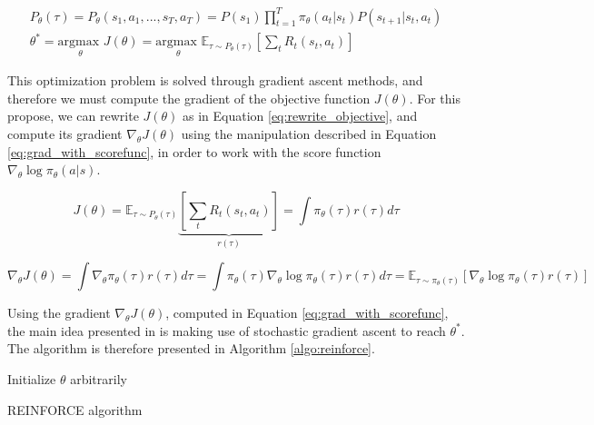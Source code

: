 \begin{align}
P_{\theta}(\tau) = P_{\theta}(s_1,a_1,...,s_T,a_T) = P(s_1)\prod_{t=1}^T{\pi_{\theta}(a_t|s_t) P(s_{t+1}|s_t,a_t)} 
\label{eq:tau_def}
\\
\theta^* = \underset{\theta}{\textrm{argmax }} J(\theta) =
\underset{\theta}{\textrm{argmax }} \mathbb{E}_{\tau \sim P_{\theta}(\tau)} \left[ \sum_t{R_t(s_t,a_t)} \right]
\label{eq:theta_max}
\end{align}

This optimization problem is solved through gradient ascent methods, and therefore we must compute the gradient of the objective function $J(\theta)$. For this propose, we can rewrite $J(\theta)$ as in Equation \eqref{eq:rewrite_objective}, and compute its gradient $\nabla_{\theta} J(\theta)$ using the manipulation described in Equation \eqref{eq:grad_with_scorefunc}, in order to work with the score function $\nabla_{\theta}\log{\pi_{\theta}(a|s)}$.

\begin{equation}
J(\theta) = \mathbb{E}_{\tau \sim P_{\theta}(\tau)} \underbrace{ \left[ \sum_t{R_t(s_t,a_t)} \right] }_{r(\tau)} = \int{\pi_{\theta}(\tau)r(\tau)d \tau}
\label{eq:rewrite_objective}
\end{equation}

\begin{equation}
\nabla_{\theta} J(\theta) = \int{\nabla_{\theta} \pi_{\theta}(\tau)r(\tau)d \tau} = 
\int{\pi_{\theta}(\tau) \nabla_{\theta} \log{\pi_{\theta}(\tau)} r(\tau)d \tau} =
\mathbb{E}_{\tau \sim \pi_{\theta}(\tau)} \left[ \nabla_{\theta} \log{\pi_{\theta}(\tau)} r(\tau) \right]
\label{eq:grad_with_scorefunc}
\end{equation}

Using the gradient $\nabla_{\theta} J(\theta)$, computed in Equation \eqref{eq:grad_with_scorefunc}, the main idea presented in \cite{REINFORCE} is making use of stochastic gradient ascent to reach $\theta^*$. The algorithm is therefore presented in Algorithm \ref{algo:reinforce}.

\begin{algorithm}[H]
    \DontPrintSemicolon
    \SetAlgoLined
    Initialize $\theta$ arbitrarily\;
    \Return{$\theta$}
    \caption{REINFORCE algorithm}
    \label{algo:reinforce}
\end{algorithm}

